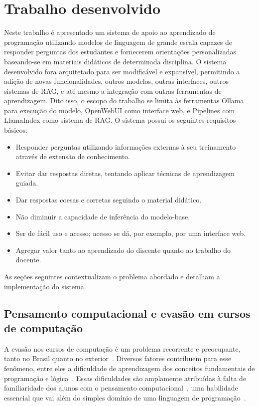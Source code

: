 \documentclass[journal]{IEEEtran}
\begin{document}
\section{Trabalho desenvolvido\label{sec:desenvolvimento}}

\noindent%
Neste trabalho é apresentado um sistema de apoio ao aprendizado de programação utilizando modelos de linguagem de grande escala capazes de responder perguntas dos estudantes e fornecerem orientações personalizadas baseando-se em materiais didáticos de determinada disciplina.
O sistema desenvolvido fora arquitetado para ser modificável e expansível, permitindo a adição de novas funcionalidades, outros modelos, outras interfaces, outros sistemas de RAG, e até mesmo a integração com outras ferramentas de aprendizagem.
Dito isso, o escopo do trabalho se limita às ferramentas Ollama para execução do modelo, OpenWebUI como interface web, e Pipelines com LlamaIndex como sistema de RAG\@.
O sistema possui os seguintes requisitos básicos:

\begin{itemize}
    \item Responder perguntas utilizando informações externas à seu treinamento através de extensão de conhecimento.
    \item Evitar dar respostas diretas, tentando aplicar técnicas de aprendizagem guiada.
    \item Dar respostas coesas e corretas seguindo o material didático.
    \item Não diminuir a capacidade de inferência do modelo-base.
    \item Ser de fácil uso e acesso; acesso se dá, por exemplo, por uma interface web.
    \item Agregar valor tanto ao aprendizado do discente quanto ao trabalho do docente.
\end{itemize}

As seções seguintes contextualizam o problema abordado e detalham a implementação do sistema.

\subsection{Pensamento computacional e evasão em cursos de computação}

\noindent%
A evasão nos cursos de computação é um problema recorrente e preocupante, tanto no Brasil quanto no exterior~\cite{alvim2024evasao,takacs2022,kinnunen2006students,hoed2017analise,watson2014failure}.
Diversos fatores contribuem para esse fenômeno, entre eles a dificuldade de aprendizagem dos conceitos fundamentais de programação e lógica~\cite{takacs2022,giraffa2023ensino}.
Essas dificuldades são amplamente atribuídas à falta de familiaridade dos alunos com o pensamento computacional~\cite{wing2008computational}, uma habilidade essencial que vai além do simples domínio de uma linguagem de programação~\cite{oliveira_de_souza_2022,hong2020introduction,gomes2017desenvolvendo,de2024ensino}.
\end{document}
